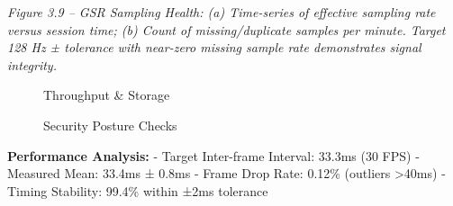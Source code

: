 \documentclass[12pt,a4paper]{article}
\begin{document}
\emph{Figure 3.9 -- GSR Sampling Health: (a) Time-series of effective sampling rate versus session time; (b) Count of missing/duplicate samples per minute. Target 128 Hz ± tolerance with near-zero missing sample rate demonstrates signal integrity.}

\begin{figure}
\centering
{}
\caption{Throughput \& Storage}
\end{figure}

\begin{figure}
\centering
{}
\caption{Security Posture Checks}
\end{figure}

\textbf{Performance Analysis:} - Target Inter-frame Interval: 33.3ms (30 FPS) - Measured Mean: 33.4ms ± 0.8ms - Frame Drop Rate: 0.12\% (outliers \textgreater40ms) - Timing Stability: 99.4\% within ±2ms tolerance
\end{document}
